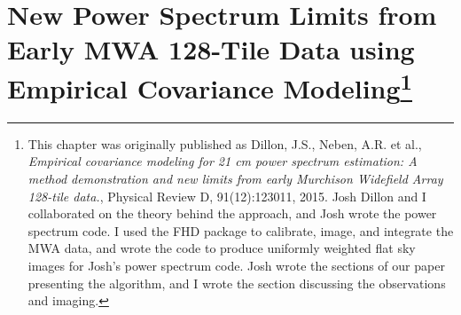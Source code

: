 \newcommand{\modelResidualCorr}{0.116}
\newcommand{\limitDeltaSq}{3.7\times 10^4}
\newcommand{\limitk}{0.18}
\newcommand{\limitz}{6.8}
\newcommand{\wedgeBuffer}{0.02}

\newcommand{\BigO}[1]{\mathcal{O}(#1)}
\newcommand{\F}{\mathbf{F}}
\newcommand{\M}{\mathbf{M}}
\newcommand{\CC}{\mathbf{C}}
\newcommand{\beq}{\begin{equation}}
\newcommand{\eeq}{\end{equation}}
\newcommand{\Sig}{\mathbf{S}}
\newcommand{\Eye}{\mathbf{I}}
\newcommand{\x}{\mathbf{x}}
\newcommand{\kvec}{\mathbf{k}}
\newcommand{\N}{\mathbf{N}}
\newcommand{\n}{\mathbf{n}}
\newcommand{\m}{\mathbf{m}}
\newcommand{\mean}{\boldsymbol\mu}
\newcommand{\base}{\mathbf{b}}
\newcommand{\thvec}{\bm{\theta}}
\newcommand{\A}{\mathbf{A}}
\newcommand{\p}{\mathbf{p}}
\newcommand{\q}{\mathbf{q}}
\newcommand{\Proj}{\mathbf{\Pi}}
\newcommand{\PSF}{\mathbf{P}} 
\newcommand{\K}{\mathbf{K}}
\newcommand{\y}{\mathbf{y}}
\newcommand{\J}{\mathbf{J}}
\newcommand{\D}{\mathbf{D}}
\newcommand{\T}{\mathbf{T}}
\newcommand{\W}{\mathbf{W}}
\newcommand{\Q}{\mathbf{Q}}
\newcommand{\E}{\mathbf{E}}
\newcommand{\trans}{\mathsf{T}}
\newcommand{\rhat}{\hat{\mathbf{r}}}
\newcommand{\xhat}{\widehat{\x}}
\newcommand{\CHat}{\widehat{\CC}}

\chapter[New Power Spectrum Limits from Early MWA 128-Tile Data using Empirical Covariance Modeling]{New Power Spectrum Limits from Early MWA 128-Tile Data using Empirical Covariance Modeling\footnote{This chapter was originally published as Dillon, J.S., Neben, A.R. et al., \textit{Empirical covariance modeling for 21 cm power spectrum estimation: A method demonstration and new limits from early Murchison Widefield Array 128-tile data.}, Physical Review D, 91(12):123011, 2015. Josh Dillon and I collaborated on the theory behind the approach, and Josh wrote the power spectrum code. I used the FHD package to calibrate, image, and integrate the MWA data, and wrote the code to produce uniformly weighted flat sky images for Josh's power spectrum code. Josh wrote the sections of our paper presenting the algorithm, and I wrote the section discussing the observations and imaging. }}
\label{chap:newlimits}

